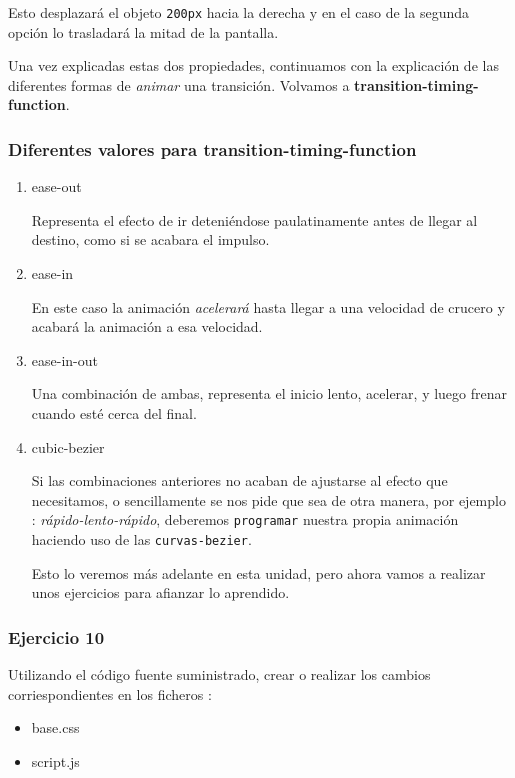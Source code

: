 \documentclass[11pt]{article}
\begin{document}
Esto desplazará el objeto \verb~200px~ hacia la derecha y en el caso de la segunda
opción lo trasladará la mitad de la pantalla.

Una vez explicadas estas dos propiedades, continuamos con la explicación de
las diferentes formas de \emph{animar} una transición. Volvamos a
\textbf{transition-timing-function}.

\subsubsection{Diferentes valores para transition-timing-function}
\label{sec-1-2-6}

\begin{enumerate}
\item ease-out
\label{sec-1-2-6-1}

Representa el efecto de ir deteniéndose paulatinamente antes de llegar al
destino, como si se acabara el impulso.

\item ease-in
\label{sec-1-2-6-2}

En este caso la animación \emph{acelerará} hasta llegar a una velocidad de
crucero y acabará la animación a esa velocidad.

\item ease-in-out
\label{sec-1-2-6-3}

Una combinación de ambas, representa el inicio lento, acelerar, y luego
frenar cuando esté cerca del final.

\item cubic-bezier
\label{sec-1-2-6-4}

Si las combinaciones anteriores no acaban de ajustarse al efecto que
necesitamos, o sencillamente se nos pide que sea de otra manera, por
ejemplo : \emph{rápido-lento-rápido}, deberemos \verb~programar~ nuestra propia
animación haciendo uso de las \verb~curvas-bezier~.

Esto lo veremos más adelante en esta unidad, pero ahora vamos a realizar
unos ejercicios para afianzar lo aprendido.
\end{enumerate}

\subsubsection{Ejercicio 10}
\label{sec-1-2-7}

Utilizando el código fuente suministrado, crear o realizar los 
cambios corriespondientes en los ficheros :

\begin{itemize}
\item base.css
\item script.js
\end{itemize}
\end{document}
